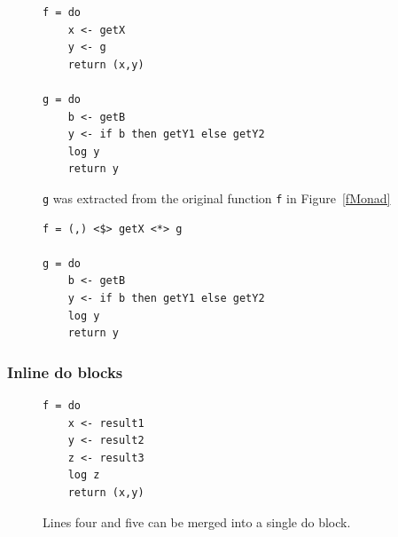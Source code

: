 \DIFdelendFL \DIFaddbeginFL \begin{figure}[t]
\begin{lstlisting}
f = do
	x <- getX
	y <- g
	return (x,y)

g = do
	b <- getB
	y <- if b then getY1 else getY2
	log y
	return y
\end{lstlisting}
\DIFaddendFL \caption{\texttt{g} was extracted from the original function \texttt{f} in Figure~\ref{fMonad}\DIFdelbeginFL {}\texttt{} %
\DIFdelendFL }\DIFaddbeginFL {}\label{gExtracted}
\DIFaddendFL \end{figure}
\DIFaddbegin 

\begin{figure}[t]
\begin{lstlisting}
f = (,) <$> getX <*> g

g = do
	b <- getB
	y <- if b then getY1 else getY2
	log y
	return y
\end{lstlisting}
\caption{\texttt{} \texttt{} }
\label{fToApp}
\end{figure}

\DIFaddend \subsubsection{Inline do blocks}

\begin{figure}[h]
\DIFdelbeginFL %
\DIFdelendFL \DIFaddbeginFL \begin{lstlisting}
f = do
	x <- result1
	y <- result2
	z <- result3
	log z
	return (x,y)
\end{lstlisting}
\DIFaddendFL \caption{Lines four and five can be merged into a single do block.}
\DIFaddbeginFL \label{logZFun}
\DIFaddendFL \end{figure}

